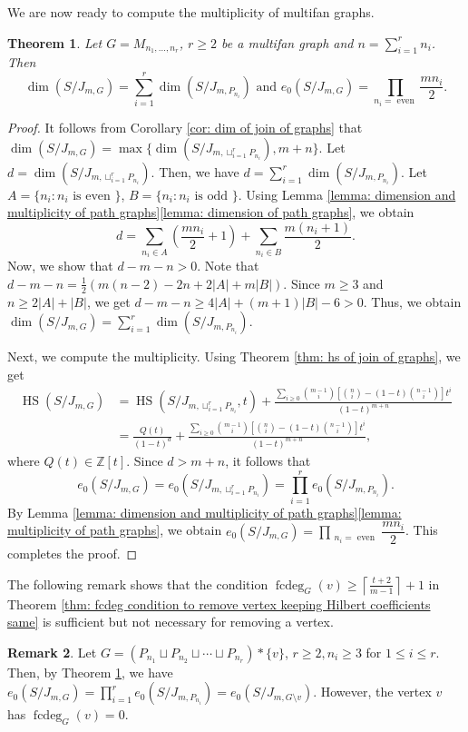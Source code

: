 \documentclass[12pt,reqno]{amsart}
\newcommand \hs{\operatorname{HS}}
\DeclareMathOperator{\fcdeg}{fcdeg}
\theoremstyle{plain}
\newtheorem{theorem}{Theorem}[section]
\theoremstyle{definition}
\newtheorem{remark}[theorem]{Remark}
\begin{document}
    We are now ready to compute the multiplicity of multifan graphs.

\begin{theorem}\label{thm: hs of multifan graph}
    Let $G=M_{n_1,\ldots,n_r}$, $r\geq 2$ be a multifan graph and $n=\sum_{i=1}^rn_i$. Then $$\dim(S/J_{m,G})=\sum_{i=1}^r\dim(S/J_{m,P_{n_i}})\text{ and }e_0(S/J_{m,G})=\prod_{n_i=\text{ even }}\dfrac{mn_i}{2}.$$
\end{theorem}
\begin{proof}
It follows from Corollary \ref{cor: dim of join of graphs} that $\dim(S/J_{m,G})=\max\{\dim(S/J_{m,\sqcup_{i=1}^rP_{n_i}}),m+n\}$. Let $d=\dim(S/J_{m,\sqcup_{i=1}^rP_{n_i}})$. Then, we have $d=\sum_{i=1}^r\dim(S/J_{m,P_{n_i}})$.
Let $A=\{n_i:n_i\text{ is even }\}$, $B=\{n_i:n_i\text{ is odd }\}$. Using Lemma \ref{lemma: dimension and multiplicity of path graphs}\eqref{lemma: dimension of path graphs}, we obtain $$d=\sum_{n_i\in A}(\frac{mn_i}{2}+1)+\sum_{n_i\in B}\frac{m(n_i+1)}{2}.$$ Now, we show that $d-m-n>0$. Note that $d-m-n=\frac{1}{2}(m(n-2)-2n+2|A|+m|B|)$. Since $m\geq 3$ and $n\geq 2|A|+|B|$, we get $d-m-n\geq 4|A|+(m+1)|B|-6>0$. Thus, we obtain $\dim(S/J_{m,G})=\sum_{i=1}^r\dim(S/J_{m,P_{n_i}})$. 

Next, we compute the multiplicity. Using Theorem \ref{thm: hs of join of graphs}, we get
   \begin{align*}
      \hs(S/J_{m,G})&=\hs(S/J_{m,\sqcup_{i=1}^rP_{n_i}},t)+\frac{\sum_{i\geq 0}\binom{m-1}{i}\left[\binom{n}{i}-(1-t)\binom{n-1}{i}\right]t^i}{(1-t)^{m+n}}\\
      &=\frac{Q(t)}{(1-t)^{d}}+\frac{\sum_{i\geq 0}\binom{m-1}{i}\left[\binom{n}{i}-(1-t)\binom{n-1}{i}\right]t^i}{(1-t)^{m+n}},
   \end{align*}
    where $Q(t)\in \mathbb Z[t]$. Since $d>m+n$, it follows that  $$e_0(S/J_{m,G})=e_0(S/J_{m,\sqcup_{i=1}^rP_{n_i}})=\prod_{i=1}^r e_0(S/J_{m,P_{n_i}}).$$ By Lemma \ref{lemma: dimension and multiplicity of path graphs}\eqref{lemma: multiplicity of path graphs}, we obtain $e_0(S/J_{m,G})=\prod_{\substack{n_i=\text{ even}}} \dfrac{mn_i}{2}$. This completes the proof.  
\end{proof}
The following remark shows that the condition
$
\fcdeg_G(v)\geq \left\lceil\frac{t+2}{m-1}\right\rceil+1
$ in Theorem \ref{thm: fcdeg condition to remove vertex keeping Hilbert coefficients same} is sufficient but not necessary for removing a vertex.

\begin{remark}
    Let $G=(P_{n_1}\sqcup P_{n_2}\sqcup\cdots\sqcup P_{n_r})*\{v\}$, $r\geq 2,n_i\geq 3$ for $1\leq i\leq r$. Then, by Theorem \ref{thm: hs of multifan graph}, we have $e_0(S/J_{m,G})=\prod_{i=1}^r e_0(S/J_{m,P_{n_i}})=e_0(S/J_{m,G\setminus v})$. However, the vertex $v$ has $\fcdeg_G(v)=0.$ 
\end{remark}
\end{document}

